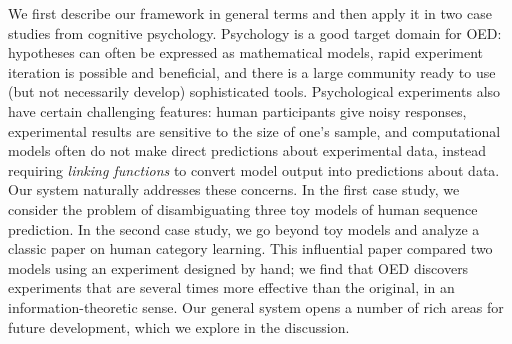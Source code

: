 \documentclass{article}
\newcommand{\ndg}[1]{\textcolor{Green}{[ndg: #1]}}
\begin{document}
We first describe our framework in general terms and then apply it in two case studies from cognitive psychology.
Psychology is a good target domain for OED: hypotheses can often be expressed as mathematical models, rapid experiment iteration is possible and beneficial, and there is a large community ready to use (but not necessarily develop) sophisticated tools.
Psychological experiments also have certain challenging features: human participants give noisy responses, experimental results are sensitive to the size of one's sample, and computational models often do not make direct predictions about experimental data, instead requiring \emph{linking functions} to convert model output into predictions about data.
Our system naturally addresses these concerns.
In the first case study, we consider the problem of disambiguating three toy models of human sequence prediction.
In the second case study, we go beyond toy models and analyze a classic paper on human category learning. This influential paper compared two models using an experiment designed by hand; we find that OED discovers experiments that are several times more effective than the original, in an information-theoretic sense.
Our general system opens a number of rich areas for future development, which we explore in the discussion.

\end{document}
